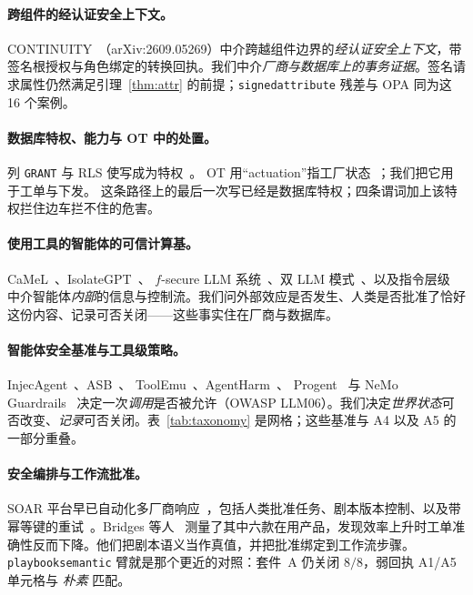 \documentclass[acmsmall,manuscript,review,anonymous]{acmart}
\renewcommand{\_}{\discretionary{\textunderscore}{}{\textunderscore}}
\begin{document}
\paragraph{跨组件的经认证安全上下文。}
CONTINUITY~\cite{continuity2026}（arXiv:2609.05269）中介跨越组件边界的\emph{经认证安全上下文}，带签名根授权与角色绑定的转换回执。我们中介\emph{厂商与数据库上的事务证据}。签名请求属性仍然满足引理~\ref{thm:attr} 的前提；\texttt{signed\_attribute} 残差与 {OPA} 同为这 16 个案例。

\paragraph{数据库特权、能力与 OT 中的处置。}
列 \texttt{GRANT} 与 RLS 使写成为特权~\cite{postgresql-rls}。
OT 用“actuation”指工厂状态~\cite{stouffer2015guide}；我们把它用于工单与下发。
这条路径上的最后一次写已经是数据库特权；四条谓词加上该特权拦住边车拦不住的危害。

\paragraph{使用工具的智能体的可信计算基。}
CaMeL~\cite{debenedetti2026camel}、IsolateGPT~\cite{wu2025isolategpt}、
$f$-secure LLM 系统~\cite{wu2024fsecure}、双 LLM 模式~\cite{willison2023duallm}、以及指令层级~\cite{wallace2024instruction} 中介智能体\emph{内部}的信息与控制流。我们问外部效应是否发生、人类是否批准了恰好这份内容、记录可否关闭——这些事实住在厂商与数据库。

\paragraph{智能体安全基准与工具级策略。}
InjecAgent~\cite{zhan2024injecagent}、ASB~\cite{zhang2024asb}、
ToolEmu~\cite{ruan2024toolemu}、AgentHarm~\cite{andriushchenko2025agentharm}、
Progent~\cite{shi2025progent} 与 NeMo Guardrails~\cite{rebedea2023nemo}
决定一次\emph{调用}是否被允许（{OWASP} {LLM06}）。我们决定\emph{世界状态}可否改变、\emph{记录}可否关闭。表~\ref{tab:taxonomy} 是网格；这些基准与 A4 以及 A5 的一部分重叠。

\paragraph{安全编排与工作流批准。}
SOAR 平台早已自动化多厂商响应~\cite{islam2019orchestration}，包括人类批准任务、剧本版本控制、以及带幂等键的重试~\cite{xsoar-manual-tasks}。Bridges
等人~\cite{bridges2023testing} 测量了其中六款在用产品，发现效率上升时工单准确性反而下降。他们把剧本语义当作真值，并把批准绑定到工作流步骤。\texttt{playbook\_semantic} 臂就是那个更近的对照：套件~A 仍关闭 $8/8$，弱回执 A1/A5 单元格与 \emph{朴素} 匹配。
\end{document}
